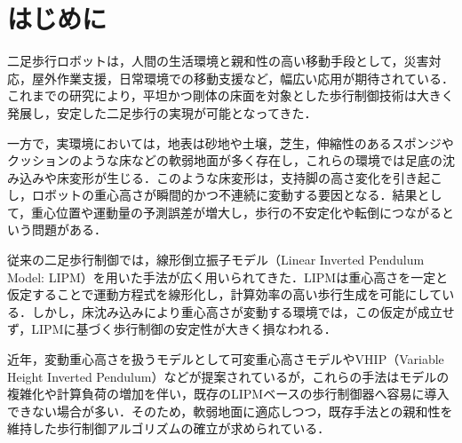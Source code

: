 
\section{はじめに}

二足歩行ロボットは，人間の生活環境と親和性の高い移動手段として，災害対応，屋外作業支援，日常環境での移動支援など，幅広い応用が期待されている．これまでの研究により，平坦かつ剛体の床面を対象とした歩行制御技術は大きく発展し，安定した二足歩行の実現が可能となってきた．

一方で，実環境においては，地表は砂地や土壌，芝生，伸縮性のあるスポンジやクッションのような床などの軟弱地面が多く存在し，これらの環境では足底の沈み込みや床変形が生じる．このような床変形は，支持脚の高さ変化を引き起こし，ロボットの重心高さが瞬間的かつ不連続に変動する要因となる．結果として，重心位置や運動量の予測誤差が増大し，歩行の不安定化や転倒につながるという問題がある．

従来の二足歩行制御では，線形倒立振子モデル（Linear Inverted Pendulum Model: LIPM）を用いた手法が広く用いられてきた\cite{kajita2001,kajita2003,pratt2006}．LIPMは重心高さを一定と仮定することで運動方程式を線形化し，計算効率の高い歩行生成を可能にしている．しかし，床沈み込みにより重心高さが変動する環境では，この仮定が成立せず，LIPMに基づく歩行制御の安定性が大きく損なわれる．

近年，変動重心高さを扱うモデルとして可変重心高さモデルやVHIP（Variable Height Inverted Pendulum）などが提案されているが，これらの手法はモデルの複雑化や計算負荷の増加を伴い，既存のLIPMベースの歩行制御器へ容易に導入できない場合が多い．そのため，軟弱地面に適応しつつ，既存手法との親和性を維持した歩行制御アルゴリズムの確立が求められている．